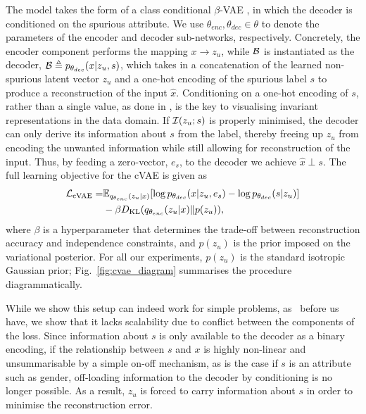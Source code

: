 The model takes the form of a class conditional $\beta$-\acs{VAE} \citep{higgins2017beta}, in which the
decoder is conditioned on the spurious attribute. 
%
We use $\theta_{enc}, \theta_{dec} \in \theta$ to denote the parameters of the encoder and decoder
sub-networks, respectively. 
%
Concretely, the encoder component performs the mapping $x \to{z_u}$, while ${\mathcal{B}}$ is instantiated as
the decoder, ${\mathcal{B}} \triangleq p_{\theta_{dec}}(x|z_u, s)$, which takes in a concatenation of the
learned non-spurious latent vector $z_u$ and a one-hot encoding of the spurious label $s$ to
produce a reconstruction of the input $\hat{x}$. 
%
Conditioning on a one-hot encoding of $s$, rather than a single value, as done in
\citet{madras2018learning}, is the key to visualising invariant representations in the data domain.
%
If ${\mathcal{I}}(z_u; s)$ is properly minimised, the decoder can only derive its information about $s$ from
the label, thereby freeing up $z_u$ from encoding the unwanted information while still allowing for
reconstruction of the input.
%
Thus, by feeding a zero-vector, \(e_s\), to the decoder we achieve $\hat{x} \perp s$. 
%
The full learning objective for the \ac{cVAE} is given as
%
\begin{align}
%
\begin{split}
    \gL_{\mathrm{cVAE}} =& 
    \E_{q_{\theta_{enc}}(z_u|x)}[
    \log
    p_{\theta_{dec}}(x|z_u, e_s) - \log p_{\theta_{dec}}(s|z_u)
    ] \\ &- \beta \KL(q_{\theta_{enc}}(z_u |x) \| p(z_u)),
\end{split}
%
\label{eq:cvae-obj}
\end{align}
%
where $\beta$ is a hyperparameter that determines the trade-off between reconstruction accuracy and
independence constraints, and $p(z_u)$ is the prior imposed on the variational posterior. 
%
For all our experiments, $p(z_u)$ is the standard isotropic Gaussian prior;
Fig.~\ref{fig:cvae_diagram} summarises the procedure diagrammatically.

While we show this setup can indeed work for simple problems, as~\citet{madras2018learning} before
us have, we show that it lacks scalability due to conflict between the components of the loss.
%
Since information about $s$ is only available to the decoder as a binary encoding, if the
relationship between $s$ and $x$ is highly non-linear and unsummarisable by a simple on-off
mechanism, as is the case if $s$ is an attribute such as gender, off-loading information to the
decoder by conditioning is no longer possible. 
%
As a result, $z_u$ is forced to carry information about $s$ in order to minimise the
reconstruction error. 

